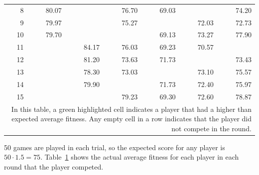 \begin{table}[htbp]
\begin{tabular}{rrrrrrr}
    8     & \cellcolor{green!55!white}80.07 &   
          & \cellcolor{green!55!white}76.70 &                           69.03 
          &                                 &                           74.20 \\
    9     & \cellcolor{green!55!white}79.97 &       
          & \cellcolor{green!55!white}75.27 &    
          &                           72.03 &                           72.73 \\
    10    & \cellcolor{green!55!white}79.70 &       
          &                                 &                           69.13 
          &                           73.27 & \cellcolor{green!55!white}77.90 \\
    11    &                                 & \cellcolor{green!55!white}84.17 
          & \cellcolor{green!55!white}76.03 &                           69.23
          &                           70.57 &    \\
    12    &                                 & \cellcolor{green!55!white}81.20 
          &                           73.63 &                           71.73 
          &                                 &                           73.43 \\
    13    &                                 & \cellcolor{green!55!white}78.30 
          &                           73.03 & 
          &                           73.10 & \cellcolor{green!55!white}75.57 \\
    14    &                                 & \cellcolor{green!55!white}79.90 
          &                                 &                           71.73 
          &                           72.40 & \cellcolor{green!55!white}75.97 \\
    15    &                                 &       
          & \cellcolor{green!55!white}79.23 &                           69.30 
          &                           72.60 & \cellcolor{green!55!white}78.87 \\
    \bottomrule
  \multicolumn{7}{p{0.6\linewidth}}{In this table, a green highlighted cell 
  indicates a player that had a higher than expected average fitness. Any
  empty cell in a row indicates that the player did not compete in the round.}
  \end{tabular}%
  \label{tab:interpop_avgfitness}%
\end{table}%

50 games are played in each trial, so the expected score for any player is \(50
\cdot 1.5 = 75\). Table~\ref{tab:interpop_avgfitness} shows the actual average
fitness for each player in each round that the player competed.

